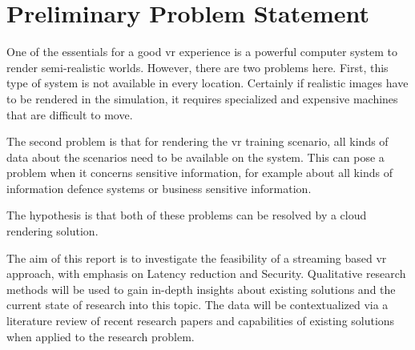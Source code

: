 \section{Preliminary Problem Statement}
One of the essentials for a good \acrfull{vr} experience is a powerful computer system to render semi-realistic
worlds. However, there are two problems here. First, this type of system is not available in every location.
Certainly if realistic images have to be rendered in the simulation, it requires specialized and expensive machines that are difficult to move. 

The second problem is that for rendering the \acrshort{vr} training scenario, all kinds of data about the scenarios need to be available on the system. 
This can pose a problem when it concerns sensitive information, for example about all kinds of information defence systems or business sensitive information.

The hypothesis is that both of these problems can be resolved by a cloud rendering solution.

The aim of this report is to investigate the feasibility of a streaming based \acrshort{vr} approach, with emphasis on Latency reduction and Security.
Qualitative research methods will be used to gain in-depth insights about existing solutions and the current state of research into this topic.
The data will be contextualized via a literature review of recent research papers and capabilities of existing solutions when applied to the research problem.